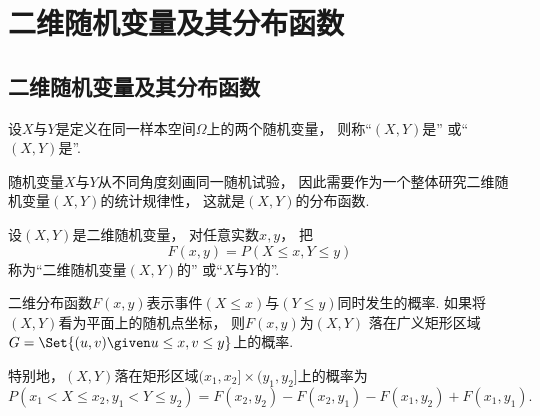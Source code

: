 \section{二维随机变量及其分布函数}
\subsection{二维随机变量及其分布函数}
\begin{definition}
设\(X\)与\(Y\)是定义在同一样本空间\(\Omega\)上的两个随机变量，
则称“\((X,Y)\)是”
或“\((X,Y)\)是”.
\end{definition}

随机变量\(X\)与\(Y\)从不同角度刻画同一随机试验，
因此需要作为一个整体研究二维随机变量\((X,Y)\)的统计规律性，
这就是\((X,Y)\)的分布函数.

\begin{definition}
设\((X,Y)\)是二维随机变量，
对任意实数\(x,y\)，
把\begin{equation}\label{equation:多维随机变量及其分布.二维分布函数的定义式}
	F(x,y) = P(X \leq x, Y \leq y)
\end{equation}
称为“二维随机变量\((X,Y)\)的”
或“\(X\)与\(Y\)的”.
\end{definition}
二维分布函数\(F(x,y)\)表示事件\((X \leq x)\)与\((Y \leq y)\)同时发生的概率.
如果将\((X,Y)\)看为平面上的随机点坐标，
则\(F(x,y)\)为\((X,Y)\)
落在广义矩形区域\(G=\Set{(u,v) \given u \leq x, v \leq y}\)上的概率.

特别地，\((X,Y)\)落在矩形区域\((x_1,x_2]\times(y_1,y_2]\)上的概率为
\begin{equation}
	P(x_1 < X \leq x_2, y_1 < Y \leq y_2)
	= F(x_2,y_2) - F(x_2,y_1) - F(x_1,y_2) + F(x_1,y_1).
\end{equation}

